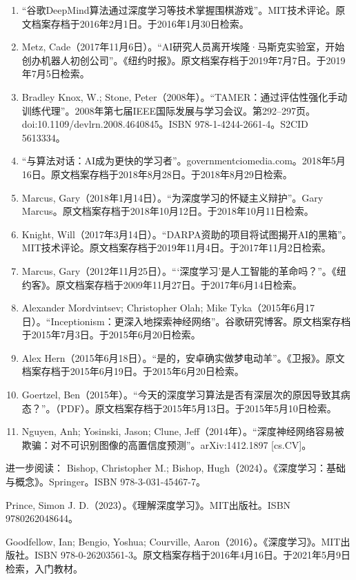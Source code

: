 \begin{enumerate}
\item “谷歌DeepMind算法通过深度学习等技术掌握围棋游戏”。MIT技术评论。原文档案存档于2016年2月1日。于2016年1月30日检索。
\item Metz, Cade（2017年11月6日）。“AI研究人员离开埃隆·马斯克实验室，开始创办机器人初创公司”。《纽约时报》。原文档案存档于2019年7月7日。于2019年7月5日检索。
\item Bradley Knox, W.; Stone, Peter（2008年）。“TAMER：通过评估性强化手动训练代理”。2008年第七届IEEE国际发展与学习会议。第292–297页。doi:10.1109/devlrn.2008.4640845。ISBN 978-1-4244-2661-4。S2CID 5613334。
\item “与算法对话：AI成为更快的学习者”。governmentciomedia.com。2018年5月16日。原文档案存档于2018年8月28日。于2018年8月29日检索。
\item Marcus, Gary（2018年1月14日）。“为深度学习的怀疑主义辩护”。Gary Marcus。原文档案存档于2018年10月12日。于2018年10月11日检索。
\item Knight, Will（2017年3月14日）。“DARPA资助的项目将试图揭开AI的黑箱”。MIT技术评论。原文档案存档于2019年11月4日。于2017年11月2日检索。
\item Marcus, Gary（2012年11月25日）。“‘深度学习’是人工智能的革命吗？”。《纽约客》。原文档案存档于2009年11月27日。于2017年6月14日检索。
\item Alexander Mordvintsev; Christopher Olah; Mike Tyka（2015年6月17日）。“Inceptionism：更深入地探索神经网络”。谷歌研究博客。原文档案存档于2015年7月3日。于2015年6月20日检索。
\item Alex Hern（2015年6月18日）。“是的，安卓确实做梦电动羊”。《卫报》。原文档案存档于2015年6月19日。于2015年6月20日检索。
\item Goertzel, Ben（2015年）。“今天的深度学习算法是否有深层次的原因导致其病态？”。（PDF）。原文档案存档于2015年5月13日。于2015年5月10日检索。
\item Nguyen, Anh; Yosinski, Jason; Clune, Jeff（2014年）。“深度神经网络容易被欺骗：对不可识别图像的高置信度预测”。arXiv:1412.1897 [cs.CV]。
\end{enumerate}



进一步阅读：
Bishop, Christopher M.; Bishop, Hugh（2024）。《深度学习：基础与概念》。Springer。ISBN 978-3-031-45467-7。

Prince, Simon J. D.（2023）。《理解深度学习》。MIT出版社。ISBN 9780262048644。

Goodfellow, Ian; Bengio, Yoshua; Courville, Aaron（2016）。《深度学习》。MIT出版社。ISBN 978-0-26203561-3。原文档案存档于2016年4月16日。于2021年5月9日检索，入门教材。